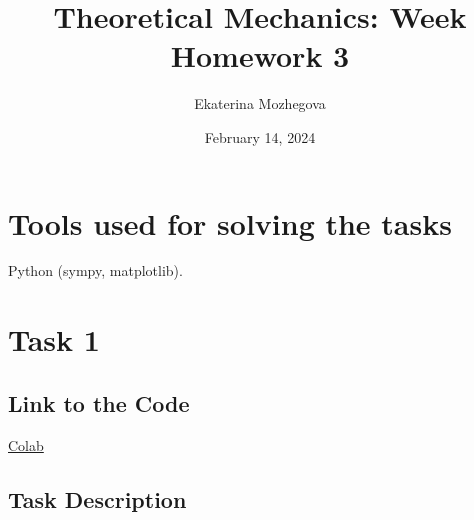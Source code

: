 \documentclass{article}
\title{Theoretical Mechanics: Week Homework 3}
\author{Ekaterina Mozhegova}
\date{February 14, 2024}
\begin{document}
\maketitle

\section{Tools used for solving the tasks}

Python (sympy, matplotlib).

\section{Task 1}

\subsection{Link to the Code}

\href{https://colab.research.google.com/drive/1k7OYh1e7fFp5451cZUbvlRyAfRPKv4Xx?usp=sharing}{Colab}

\subsection{Task Description}
\end{document}
